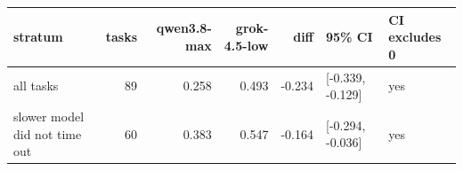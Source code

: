 \begin{tabular}{lrrrrll}
\toprule
stratum & tasks & qwen3.8-max & grok-4.5-low & diff & 95\% CI & CI excludes 0 \\
\midrule
all tasks & 89 & 0.258 & 0.493 & -0.234 & [-0.339, -0.129] & yes \\
slower model did not time out & 60 & 0.383 & 0.547 & -0.164 & [-0.294, -0.036] & yes \\
\bottomrule
\end{tabular}
